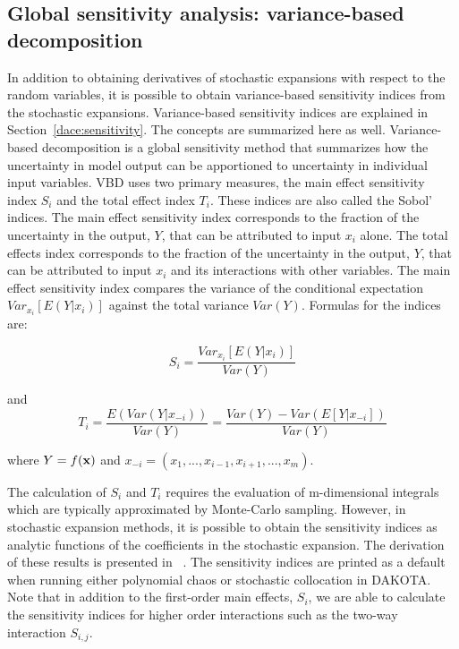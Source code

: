 \subsection{Global sensitivity analysis: variance-based decomposition}\label{uq:expansion:vbd}

In addition to obtaining derivatives of stochastic expansions with 
respect to the random variables, it is possible to obtain 
variance-based sensitivity indices from the stochastic expansions. 
Variance-based sensitivity indices are explained in 
Section~\ref{dace:sensitivity}.  The concepts are summarized here 
as well.  Variance-based decomposition 
is a global sensitivity method that summarizes how the uncertainty 
in model output can be apportioned to uncertainty in individual 
input variables.  VBD uses two primary measures, the main effect 
sensitivity index $S_{i}$ and the total effect index $T_{i}$.  These 
indices are also called the Sobol' indices. 
The main effect sensitivity 
index corresponds to the fraction of the uncertainty in the output, $Y$, 
that can be attributed to input $x_{i}$ alone.  The total effects index 
corresponds to the fraction of the uncertainty in 
the output, $Y$, that can be attributed to input $x_{i}$ and its 
interactions with other variables. The main effect sensitivity index
compares the variance of the conditional expectation
$Var_{x_{i}}[E(Y|x_{i})]$ against the total variance $Var(Y)$.
Formulas for the indices are: 

\begin{equation}
S_{i}=\frac{Var_{x_{i}}[E(Y|x_{i})]}{Var(Y)}
\end{equation}

and 
\begin{equation}
T_{i}=\frac{E(Var(Y|x_{-i}))}{Var(Y)}=\frac{Var(Y)-Var(E[Y|x_{-i}])}{Var(Y)}
\end{equation}

where $Y=f({\bf x})$ and ${x_{-i}=(x_{1},...,x_{i-1},x_{i+1},...,x_{m})}$.

The calculation of $S_{i}$ and $T_{i}$ requires the evaluation of 
m-dimensional integrals which are typically approximated by Monte-Carlo 
sampling. However, in stochastic expansion methods, it is possible to 
obtain the sensitivity indices as analytic functions of the 
coefficients in the stochastic expansion.  The derivation 
of these results is presented in ~\cite{Tang10b}. The sensitivity 
indices are printed as a default when running either 
polynomial chaos or stochastic collocation in DAKOTA. 
Note that in addition to the first-order main effects, $S_{i}$, 
we are able to calculate the sensitivity indices for higher order 
interactions such as the two-way interaction  $S_{i,j}$.   

